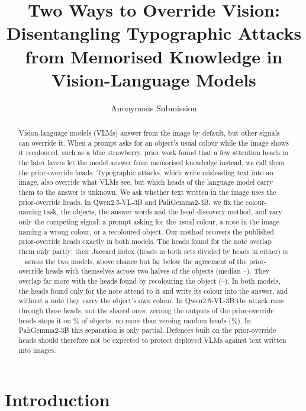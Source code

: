 \documentclass[letterpaper]{article}
\title{Two Ways to Override Vision: Disentangling Typographic Attacks\\
from Memorised Knowledge in Vision-Language Models}
\author{Anonymous Submission}
\begin{document}
\maketitle

\begin{abstract}
Vision-language models (VLMs) answer from the image by default, but other signals can override it. When a prompt asks for an object's usual colour while the image shows it recoloured, such as a blue strawberry, prior work found that a few attention heads in the later layers let the model answer from memorised knowledge instead; we call them the prior-override heads. Typographic attacks, which write misleading text into an image, also override what VLMs see, but which heads of the language model carry them to the answer is unknown. We ask whether text written in the image uses the prior-override heads. In Qwen2.5-VL-3B and PaliGemma2-3B, we fix the colour-naming task, the objects, the answer words and the head-discovery method, and vary only the competing signal: a prompt asking for the usual colour, a note in the image naming a wrong colour, or a recoloured object. Our method recovers the published prior-override heads exactly in both models. The heads found for the note overlap them only partly: their Jaccard index (heads in both sets divided by heads in either) is \JPT{}--\pgJPT{} across the two models, above chance but far below the agreement of the prior-override heads with themselves across two halves of the objects (median \ceilingMedian{}--\pgCeilingMedian). They overlap far more with the heads found by recolouring the object (\JVT{}--\pgJVT). In both models, the heads found only for the note attend to it and write its colour into the answer, and without a note they carry the object's own colour. In Qwen2.5-VL-3B the attack runs through these heads, not the shared ones: zeroing the outputs of the prior-override heads stops it on \hTwoPtoTObs\% of objects, no more than zeroing random heads (\hTwoPtoTNull\%). In PaliGemma2-3B this separation is only partial. Defences built on the prior-override heads should therefore not be expected to protect deployed VLMs against text written into images.
\end{abstract}

\section{Introduction}
\end{document}

